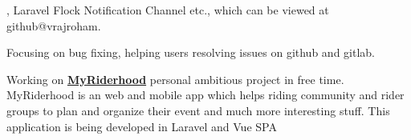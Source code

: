 \begin{cventries}
{\begin{cvitems}
{{,  Laravel Flock Notification Channel} etc., which can be viewed at github@vrajroham. }
        \item {Focusing on bug fixing, helping users resolving issues on github and gitlab.}
        \item {Working on \textbf{\href{https://myriderhood.com}{MyRiderhood}} personal ambitious project in free time. MyRiderhood is an web and mobile app which helps riding community and rider groups to plan and organize their event and much more interesting stuff. This application is being developed in Laravel and Vue SPA}
      \end{cvitems}
    }

\end{cventries}
